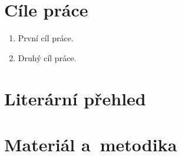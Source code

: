 \newpage
\section{Cíle práce}

\begin{enumerate}
\item První cíl práce.
\item Druhý cíl práce.
\end{enumerate}






























\newpage
\section{Literární přehled}











\newpage
\section{Materiál a~metodika}






























